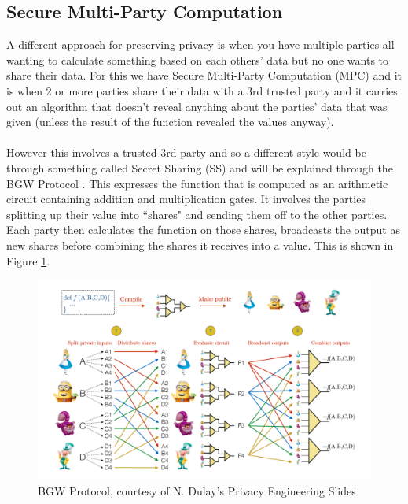 \subsection{Secure Multi-Party Computation}
A different approach for preserving privacy is when you have multiple parties all wanting to calculate something based on each others' data but no one wants to share their data. For this we have Secure Multi-Party Computation (MPC) and it is when 2 or more parties share their data with a 3rd trusted party and it carries out an algorithm that doesn't reveal anything about the parties' data that was given (unless the result of the function revealed the values anyway). \\ \\
However this involves a trusted 3rd party and so a different style would be through something called Secret Sharing (SS) and will be explained through the BGW Protocol \cite{bgw}. This expresses the function that is computed as an arithmetic circuit containing addition and multiplication gates. It involves the parties splitting up their value into ``shares" and sending them off to the other parties. Each party then calculates the function on those shares, broadcasts the output as new shares before combining the shares it receives into a value. This is shown in Figure \ref{fig:bgw}.
\begin{figure}[htbp]
	\centering
    \includegraphics[scale=0.3]{background/bgw.png}
	\caption{BGW Protocol, courtesy of N. Dulay's Privacy Engineering Slides \cite{priv_eng}}
	\label{fig:bgw}
\end{figure}


